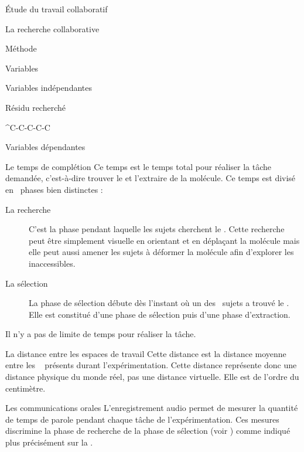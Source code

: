 \documentclass[myfrancais]{mythesis}
\begin{document}
\begin{mypart}{Étude du travail collaboratif}
\begin{mychapter}{La recherche collaborative}
\begin{mysection}{Méthode}
\begin{mysubsection}{Variables}
\begin{mysubsubsection}{Variables indépendantes}
\begin{myparagraph}{ Résidu recherché}
\begin{mytable}
\begin{mytabular}{^C-C-C-C-C}
									\mybottomrule
								\end{mytabular}
							\end{mytable}
						\end{myparagraph}
					\end{mysubsubsection}
					\begin{mysubsubsection}{Variables dépendantes}
						\begin{myparagraph}{ Le temps de complétion}
							Ce temps est le temps total pour réaliser la tâche demandée, c'est-à-dire trouver le  et l'extraire de la molécule.
							Ce temps est divisé en ~phases bien distinctes :
							\begin{description}
								\item[La recherche] C'est la phase pendant laquelle les sujets cherchent le .
									Cette recherche peut être simplement visuelle en orientant et en déplaçant la molécule mais elle peut aussi amener les sujets à déformer la molécule afin d'explorer les  inaccessibles.
								\item[La sélection] La phase de sélection débute dès l'instant où un des ~sujets a trouvé le .
									Elle est constitué d'une phase de sélection puis d'une phase d'extraction.
							\end{description}
							Il n'y a pas de limite de temps pour réaliser la tâche.
						\end{myparagraph}
						\begin{myparagraph}{ La distance entre les espaces de travail}
							Cette distance est la distance moyenne entre les ~ présents durant l'expérimentation.
							Cette distance représente donc une distance physique du monde réel, pas une distance virtuelle.
							Elle est de l'ordre du centimètre.
						\end{myparagraph}
						\begin{myparagraph}{ Les communications orales}
							L'enregistrement audio permet de mesurer la quantité de temps de parole pendant chaque tâche de l'expérimentation.
							Ces mesures discrimine la phase de recherche de la phase de sélection (voir ) comme indiqué plus précisément sur la .


\end{myparagraph}
\end{mysubsubsection}
\end{mysubsection}
\end{mysection}
\end{mychapter}
\end{mypart}
\end{document}
